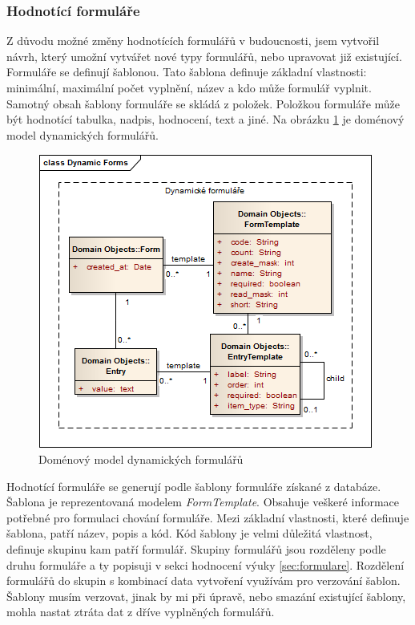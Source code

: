 \subsubsection{Hodnotící formuláře}
Z důvodu možné změny hodnotících formulářů v budoucnosti, jsem vytvořil návrh, který umožní vytvářet nové typy formulářů, nebo upravovat již existující. Formuláře se definují šablonou. Tato šablona definuje základní vlastnosti: minimální, maximální počet vyplnění, název a kdo může formulář vyplnit. Samotný obsah šablony formuláře se skládá z položek. Položkou formuláře může být hodnotící tabulka, nadpis, hodnocení, text a jiné. Na obrázku \ref{fig:dynamicform} je doménový model dynamických formulářů. 

\begin{figure}[h]
\begin{center}
\includegraphics[scale=0.6]{figures/DynamicForms}
\caption{Doménový model dynamických formulářů}
\label{fig:dynamicform}
\end{center}
\end{figure}

Hodnotící formuláře se generují podle šablony formuláře získané z databáze. Šablona je reprezentovaná modelem \textit{FormTemplate}. Obsahuje veškeré informace potřebné pro formulaci chování formuláře. Mezi základní vlastnosti, které definuje šablona, patří název, popis a kód. Kód šablony je velmi důležitá vlastnost, definuje skupinu kam patří formulář. Skupiny formulářů jsou rozděleny podle druhu formuláře a ty popisuji v sekci hodnocení výuky \ref{sec:formulare}. Rozdělení formulářů do skupin s kombinací data vytvoření využívám pro verzování šablon. Šablony musím verzovat, jinak by mi při úpravě, nebo smazání existující šablony, mohla nastat ztráta dat z  dříve vyplněných formulářů.

